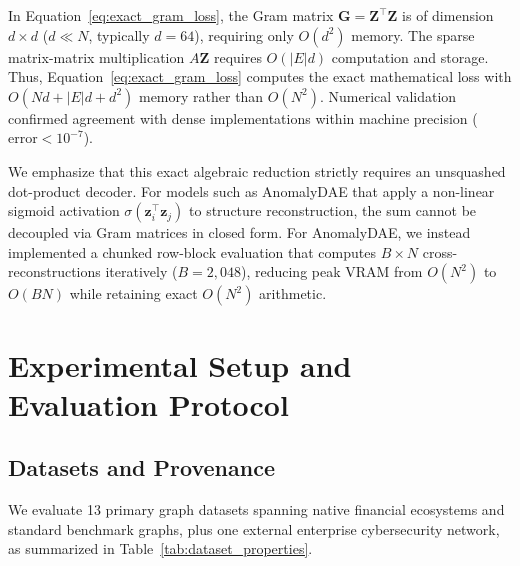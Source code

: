 \documentclass[applsci,article,submit,moreauthors,pdftex]{Definitions/mdpi}
\begin{document}
In Equation~\eqref{eq:exact_gram_loss}, the Gram matrix $\mathbf{G} = \mathbf{Z}^\top \mathbf{Z}$ is of dimension $d \times d$ ($d \ll N$, typically $d=64$), requiring only $O(d^2)$ memory. The sparse matrix-matrix multiplication $A \mathbf{Z}$ requires $O(|E|d)$ computation and storage. Thus, Equation~\eqref{eq:exact_gram_loss} computes the exact mathematical loss with $O(N d + |E| d + d^2)$ memory rather than $O(N^2)$. Numerical validation confirmed agreement with dense implementations within machine precision ($\text{error} < 10^{-7}$).

We emphasize that this exact algebraic reduction strictly requires an unsquashed dot-product decoder. For models such as AnomalyDAE that apply a non-linear sigmoid activation $\sigma(\mathbf{z}_i^\top \mathbf{z}_j)$ to structure reconstruction, the sum cannot be decoupled via Gram matrices in closed form. For AnomalyDAE, we instead implemented a chunked row-block evaluation that computes $B \times N$ cross-reconstructions iteratively ($B=2,048$), reducing peak VRAM from $O(N^2)$ to $O(B N)$ while retaining exact $O(N^2)$ arithmetic.

\section{Experimental Setup and Evaluation Protocol}
\label{sec:experimental_setup}

\subsection{Datasets and Provenance}
We evaluate 13 primary graph datasets spanning native financial ecosystems and standard benchmark graphs, plus one external enterprise cybersecurity network, as summarized in Table~\ref{tab:dataset_properties}.
\end{document}
